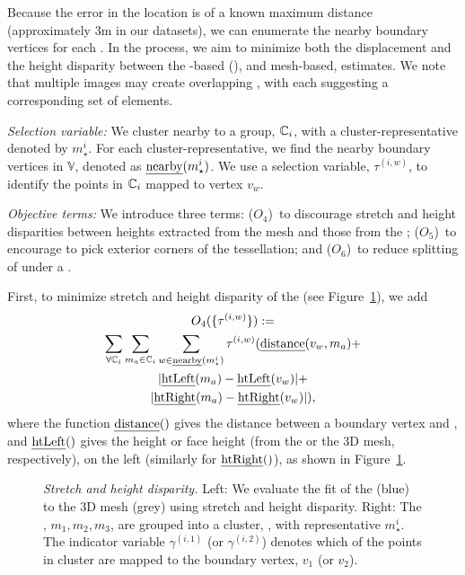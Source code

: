  Because the error in the \buildingfacade location is of a known maximum distance (approximately 3m in our datasets), we can enumerate the nearby boundary vertices for each \buildingfacadepoint. In the process, we aim to minimize both the \buildingfacadepoint displacement and the height disparity between the \buildingfacade-based (\streetI), and mesh-based, estimates. We note that multiple images may create overlapping \buildingfacades, with each suggesting a corresponding set of \facade elements.

{\noindent \em Selection variable:} 
We cluster nearby \buildingfacadepoints to a group, $\mathbb{C}_i$, with a cluster-representative denoted by $m^i_\star$. 
For each cluster-representative, we find the nearby boundary vertices in $\mathbb{V}$, denoted as $\text{\emph{nearby}}(m^i_\star)$. We use a selection variable, ${\tau^{(i,w)}}$, to identify the points in $\mathbb{C}_i$ mapped to vertex $v_w$. 


{\noindent \em Objective terms:} %
We introduce three terms: 
($O_4$)~to discourage stretch and height disparities between heights extracted from the mesh and those from the \streetI; 
($O_5$)~to encourage \buildingfacadepoints to pick exterior corners of the tessellation; and 
($O_6$)~to reduce splitting of \footprintpolygons under a \buildingfacade. 

First, to minimize stretch and height disparity of the \buildingfacades (see Figure~\ref{fig:mfpoint}), we add
% 
\begin{multline*}
O_4 ( \{ \tau^{(i,w)} \} ) :=\\
\sum_{\forall \mathbb{C}_i} 
\sum_{m_a \in \mathbb{C}_i} 
\sum_{w \in \text{\emph{nearby}}(m^i_\star) }
\tau^{(i,w)} ( \text{\emph{distance}}{}{}(v_w, m_a) +\\
| \text{\emph{htLeft}}{}( m_a ) - \text{\emph{htLeft}}{} ( v_w ) | +\\
| \text{\emph{htRight}}{}( m_a ) - \text{\emph{htRight}}{} ( v_w )| ),
\end{multline*}
% 
where the function $\text{\emph{distance}}{}()$ gives the distance between a boundary vertex and \buildingfacadepoint, and $\text{\emph{htLeft}}{}()$ gives the \buildingfacade height or face height  (from the \streetI or the 3D mesh, respectively), on the left (similarly for $\text{\emph{htRight}}{}()$), as shown in Figure~\ref{fig:mfpoint}. 
% 


\begin{figure}[t]
    \centering
  \def\svgwidth{\columnwidth}  
    
    \caption{{\it Stretch and height disparity.} Left: We evaluate the fit of the \buildingfacade(blue) to the 3D mesh (grey) using stretch and height disparity. Right: The \buildingfacadepoints, $m_1, m_2, m_3$, are grouped into a cluster, , with representative $m^i_\star$. The indicator variable $\gamma^{(i,1)}$ (or $\gamma^{(i,2)}$) denotes which of the points in cluster  are mapped to the boundary vertex, $v_1$ (or $v_2$).}
  \label{fig:mfpoint}
\end{figure}



